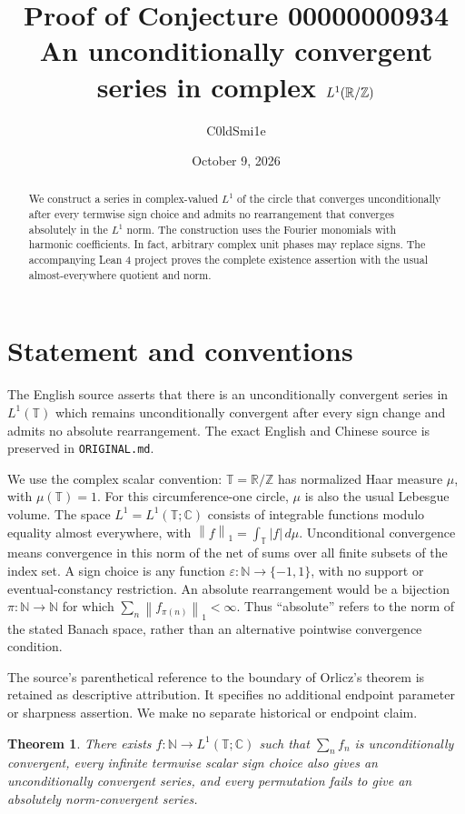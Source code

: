 \documentclass[11pt]{article}
\title{Proof of Conjecture 00000000934\\[4pt]
\large An unconditionally convergent series in complex $L^1(\R/\mathbb{Z})$}
\author{C0ldSmi1e}
\date{October 9, 2026}
\newtheorem{theorem}{Theorem}
\newcommand{\T}{\mathbb{T}}
\newcommand{\N}{\mathbb{N}}
\newcommand{\C}{\mathbb{C}}
\newcommand{\R}{\mathbb{R}}
\newcommand{\norm}[1]{\left\lVert#1\right\rVert}
\begin{document}
\maketitle

\begin{abstract}
We construct a series in complex-valued $L^1$ of the circle that converges
unconditionally after every termwise sign choice and admits no rearrangement
that converges absolutely in the $L^1$ norm. The construction uses the Fourier
monomials with harmonic coefficients. In fact, arbitrary complex unit phases
may replace signs. The accompanying Lean 4 project proves the complete
existence assertion with the usual almost-everywhere quotient and norm.
\end{abstract}

\section{Statement and conventions}
The English source asserts that there is an unconditionally convergent series
in $L^1(\T)$ which remains unconditionally convergent after every sign change
and admits no absolute rearrangement. The exact English and Chinese source
is preserved in \texttt{ORIGINAL.md}.

We use the complex scalar convention: $\T=\R/\mathbb{Z}$ has normalized Haar
measure $\mu$, with $\mu(\T)=1$. For this circumference-one circle, $\mu$ is
also the usual Lebesgue volume. The space $L^1=L^1(\T;\C)$ consists of
integrable functions modulo equality almost everywhere, with
$\norm{f}_1=\int_{\T}|f|\,d\mu$.
Unconditional convergence means convergence in this norm of the net of sums
over all finite subsets of the index set. A sign choice is any function
$\varepsilon:\N\to\{-1,1\}$, with no support or eventual-constancy restriction.
An absolute rearrangement would be a bijection $\pi:\N\to\N$ for which
$\sum_n\norm{f_{\pi(n)}}_1<\infty$. Thus ``absolute'' refers to the norm of
the stated Banach space, rather than an alternative pointwise convergence condition.

The source's parenthetical reference to the boundary of Orlicz's theorem is
retained as descriptive attribution. It specifies no additional endpoint
parameter or sharpness assertion. We make no separate historical or endpoint claim.

\begin{theorem}
There exists $f:\N\to L^1(\T;\C)$ such that $\sum_n f_n$ is
unconditionally convergent, every infinite termwise scalar sign choice also
gives an unconditionally convergent series, and every permutation fails to
give an absolutely norm-convergent series.
\end{theorem}
\end{document}
